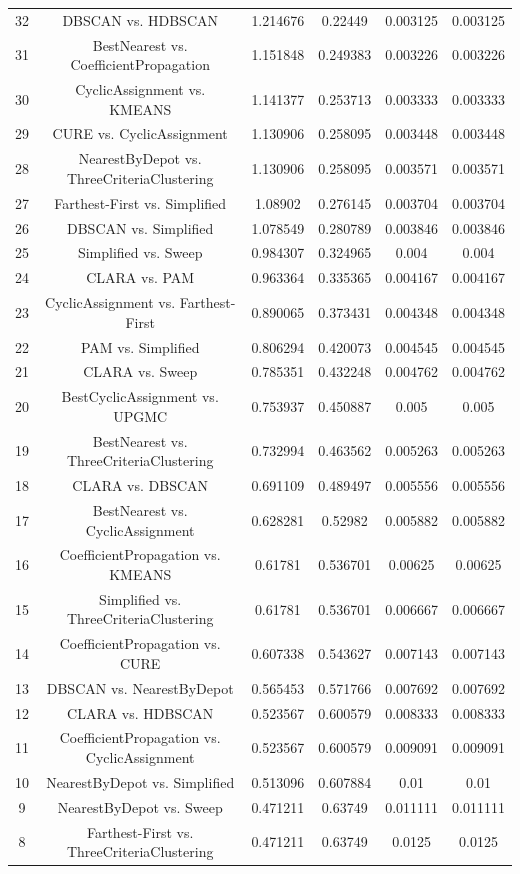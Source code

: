 \documentclass[a4paper,10pt]{article}
\begin{document}
\begin{landscape}
\begin{table}[!htp]
\begin{tabular}{cccccc}
32&DBSCAN vs. HDBSCAN&1.214676&0.22449&0.003125&0.003125\\
31&BestNearest vs. CoefficientPropagation&1.151848&0.249383&0.003226&0.003226\\
30&CyclicAssignment vs. KMEANS&1.141377&0.253713&0.003333&0.003333\\
29&CURE vs. CyclicAssignment&1.130906&0.258095&0.003448&0.003448\\
28&NearestByDepot vs. ThreeCriteriaClustering&1.130906&0.258095&0.003571&0.003571\\
27&Farthest-First vs. Simplified&1.08902&0.276145&0.003704&0.003704\\
26&DBSCAN vs. Simplified&1.078549&0.280789&0.003846&0.003846\\
25&Simplified vs. Sweep&0.984307&0.324965&0.004&0.004\\
24&CLARA vs. PAM&0.963364&0.335365&0.004167&0.004167\\
23&CyclicAssignment vs. Farthest-First&0.890065&0.373431&0.004348&0.004348\\
22&PAM vs. Simplified&0.806294&0.420073&0.004545&0.004545\\
21&CLARA vs. Sweep&0.785351&0.432248&0.004762&0.004762\\
20&BestCyclicAssignment vs. UPGMC&0.753937&0.450887&0.005&0.005\\
19&BestNearest vs. ThreeCriteriaClustering&0.732994&0.463562&0.005263&0.005263\\
18&CLARA vs. DBSCAN&0.691109&0.489497&0.005556&0.005556\\
17&BestNearest vs. CyclicAssignment&0.628281&0.52982&0.005882&0.005882\\
16&CoefficientPropagation vs. KMEANS&0.61781&0.536701&0.00625&0.00625\\
15&Simplified vs. ThreeCriteriaClustering&0.61781&0.536701&0.006667&0.006667\\
14&CoefficientPropagation vs. CURE&0.607338&0.543627&0.007143&0.007143\\
13&DBSCAN vs. NearestByDepot&0.565453&0.571766&0.007692&0.007692\\
12&CLARA vs. HDBSCAN&0.523567&0.600579&0.008333&0.008333\\
11&CoefficientPropagation vs. CyclicAssignment&0.523567&0.600579&0.009091&0.009091\\
10&NearestByDepot vs. Simplified&0.513096&0.607884&0.01&0.01\\
9&NearestByDepot vs. Sweep&0.471211&0.63749&0.011111&0.011111\\
8&Farthest-First vs. ThreeCriteriaClustering&0.471211&0.63749&0.0125&0.0125\\

\end{tabular}
\end{table}
\end{landscape}
\end{document}
